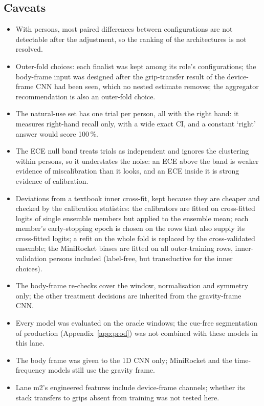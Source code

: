 
\subsection{Caveats}\label{app:m3:caveats}

\begin{itemize}
  \item With  persons, most paired differences between configurations are not detectable after the adjustment, so the ranking of the architectures is not resolved.
  \item Outer-fold choices: each finalist was kept among its role's configurations; the body-frame input was designed after the grip-transfer result of the device-frame CNN had been seen, which no nested estimate removes; the aggregator recommendation is also an outer-fold choice.
  \item The natural-use set has one trial per person, all with the right hand: it measures right-hand recall only, with a wide exact CI, and a constant `right' answer would score 100\,\%.
  \item The ECE null band treats trials as independent and ignores the clustering within persons, so it understates the noise: an ECE above the band is weaker evidence of miscalibration than it looks, and an ECE inside it is strong evidence of calibration.
  \item Deviations from a textbook inner cross-fit, kept because they are cheaper and checked by the calibration statistics: the calibrators are fitted on cross-fitted logits of single ensemble members but applied to the ensemble mean; each member's early-stopping epoch is chosen on the rows that also supply its cross-fitted logits; a refit on the whole fold is replaced by the cross-validated ensemble; the MiniRocket biases are fitted on all outer-training rows, inner-validation persons included (label-free, but transductive for the inner choices).
  \item The body-frame re-checks cover the window, normalisation and symmetry only; the other treatment decisions are inherited from the gravity-frame CNN.
  \item Every model was evaluated on the oracle windows; the cue-free segmentation of production (Appendix~\ref{app:prod}) was not combined with these models in this lane.
  \item The body frame was given to the 1D CNN only; MiniRocket and the time-frequency models still use the gravity frame.
  \item Lane m2's engineered features include device-frame channels; whether its stack transfers to grips absent from training was not tested here.
\end{itemize}
